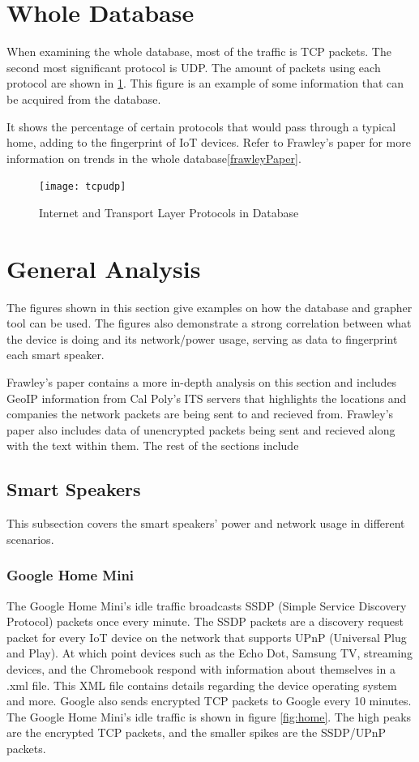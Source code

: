 \section{Whole Database}
\label{wholeDB}
When examining the whole database, most of the traffic is TCP packets. The second most significant protocol is UDP. The amount of packets using each protocol are shown in \ref{fig:tcpudp}. This figure is an example of some information that can be acquired from the database.

It shows the percentage of certain protocols that would pass through a typical home, adding to the fingerprint of IoT devices. Refer to Frawley's paper for more information on trends in the whole database\ref{frawleyPaper}.

\label{Whole Database}
\begin{figure}[H]
  \centering
    \texttt{[image: tcpudp]}
  \caption{Internet and Transport Layer Protocols in Database}
  \label{fig:tcpudp}
\end{figure}

\section{General Analysis}
\label{General Analysis}
The figures shown in this section give examples on how the database and grapher tool can be used. The figures also demonstrate a strong correlation between what the device is doing and its network/power usage, serving as data to fingerprint each smart speaker.

Frawley's paper contains a more in-depth analysis on this section and includes GeoIP \cite{maxmind} information from Cal Poly's ITS servers \cite{its} that highlights the locations and companies the network packets are being sent to and recieved from. Frawley's paper also includes data of unencrypted packets being sent and recieved along with the text within them. The rest of the sections include

\subsection{Smart Speakers}
\label{smartSpeakerResults}
This subsection covers the smart speakers' power and network usage in different scenarios.

\subsubsection{Google Home Mini}
The Google Home Mini's idle traffic broadcasts SSDP (Simple Service Discovery Protocol) packets once every minute. The SSDP packets are a discovery request packet for every IoT device on the network that supports UPnP (Universal Plug and Play). At which point devices such as the Echo Dot, Samsung TV, streaming devices, and the Chromebook respond with information about themselves in a .xml file. This XML file contains details regarding the device operating system and more. Google also sends encrypted TCP packets to Google every 10 minutes. The Google Home Mini's idle traffic is shown in figure \ref{fig:home}. The high peaks are the encrypted TCP packets, and the smaller spikes are the SSDP/UPnP packets.

